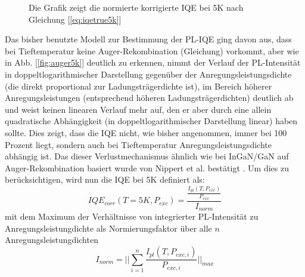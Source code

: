 \begin{figure}[ht]
\begin{minipage}[t]{0.49\linewidth}
        \caption{Die Grafik zeigt die normierte korrigierte IQE bei 5K nach Gleichung [\ref{eq:iqetrue5k}] }
        \label{fig:trueiqe}
    \end{minipage}
\end{figure}
\vspace{0.1cm}
\noindent
Das bisher benutzte Modell zur Bestimmung der PL-IQE ging davon aus, dass bei Tieftemperatur keine Auger-Rekombination (Gleichung) vorkommt, aber wie in Abb. [\ref{fig:auger5k}] deutlich zu erkennen, nimmt der Verlauf der PL-Intensität in doppeltlogarithmischer Darstellung gegenüber der Anregungsleistungsdichte (die direkt proportional zur Ladungsträgerdichte ist), im Bereich höherer Anregungsleistungen (entsprechend höheren Ladungsträgerdichten) deutlich ab und weist keinen linearen Verlauf mehr auf, den er aber durch eine allein quadratische Abhängigkeit (in doppeltlogarithmischer Darstellung linear) haben sollte. Dies zeigt, dass die IQE nicht, wie bisher angenommen, immer bei 100 Prozent liegt, sondern auch bei Tieftemperatur Anregungsleistungsdichte abhängig ist. Das dieser Verlustmechanismus ähnlich wie bei InGaN/GaN auf Auger-Rekombination basiert wurde von Nippert et al. bestätigt \cite{doi:10.1063/1.4965298}. 
Um dies zu berücksichtigen, wird nun die IQE bei 5K definiert als:
%
\begin{equation}
    IQE_{corr}(T = 5K, P_{exc}) = \frac{ \frac{I_{pl}(T,P_{exc}) }{P_{exc} } } { I_{norm}}
    \label{eq:iqetrue5k}
\end{equation}
%
mit dem Maximum der Verhältnisse von integrierter PL-Intensität zu Anregungsleistungdichte als  Normierungsfaktor über alle $n$ Anregungsleistungdichten
\begin{equation}
    I_{norm} = \lvert \lvert \sum_{i=1}^{n} \frac{I_{pl}(T,P_{exc,i})}{P_{exc,i}} \lvert \lvert_{max}
    \label{eq:iplnorm}
\end{equation}
%
